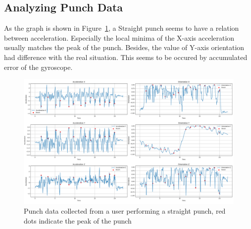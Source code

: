 \documentclass{article}
\begin{document}
\FloatBarrier
\subsection{Analyzing Punch Data}

As the graph is shown in Figure~\ref{fig:straight_user_input}, a Straight punch seems to have a relation between acceleration. Especially the local minima of the X-axis acceleration usually matches the peak of the punch. Besides, the value of Y-axis orientation had difference with the real situation. This seems to be occured by accumulated error of the gyroscope.

\FloatBarrier
\begin{figure}[h]
    \centering
    \includegraphics[width=\textwidth]{straight_user_input.png}
    \caption{Punch data collected from a user performing a straight punch, red dots indicate the peak of the punch}
    \label{fig:straight_user_input}
\end{figure}
\end{document}
